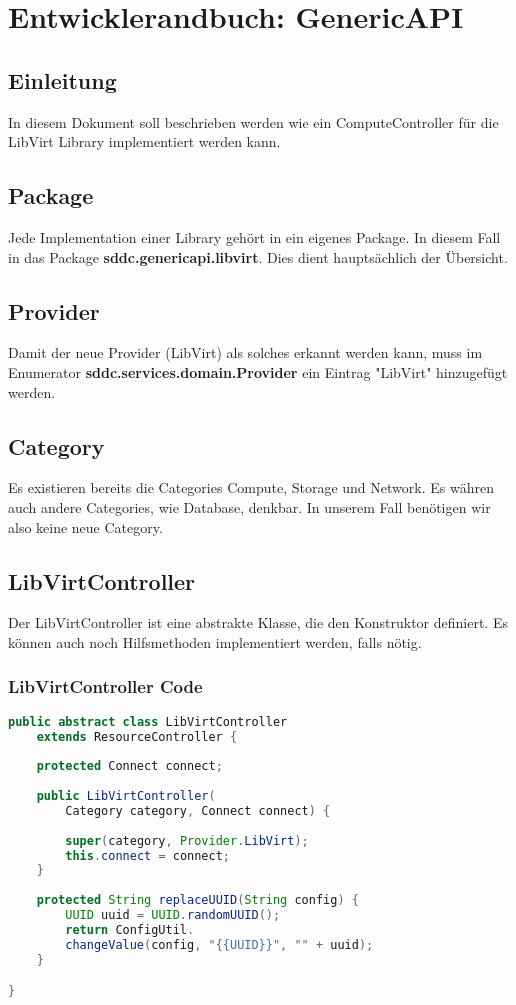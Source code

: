 \chapter{Entwicklerandbuch: GenericAPI}
\section{Einleitung}
In diesem Dokument soll beschrieben werden wie ein ComputeController für die LibVirt Library implementiert werden kann. 

\section{Package}
Jede Implementation einer Library gehört in ein eigenes Package. In diesem Fall in das Package 
\textbf{sddc.genericapi.libvirt}. Dies dient hauptsächlich der Übersicht.

\section{Provider}
Damit der neue Provider (LibVirt) als solches erkannt werden kann, muss im Enumerator 
\textbf{sddc.services.domain.Provider} ein Eintrag "LibVirt" hinzugefügt werden.


\section{Category}
Es existieren bereits die Categories Compute, Storage und Network. Es währen auch andere Categories, wie Database, denkbar. In unserem Fall benötigen wir also keine neue Category.

\newpage

\section{LibVirtController}
Der LibVirtController ist eine abstrakte Klasse, die den Konstruktor definiert. Es können auch noch Hilfsmethoden implementiert werden, falls nötig.

\subsection{LibVirtController Code}

\begin{lstlisting}[language=Java,frame=single] 
public abstract class LibVirtController 
	extends ResourceController {
	
	protected Connect connect;
	
	public LibVirtController(
		Category category, Connect connect) {
		
		super(category, Provider.LibVirt);
		this.connect = connect;
	}
	
	protected String replaceUUID(String config) {
		UUID uuid = UUID.randomUUID();
		return ConfigUtil.
		changeValue(config, "{{UUID}}", "" + uuid);
	}

}
\end{lstlisting}

